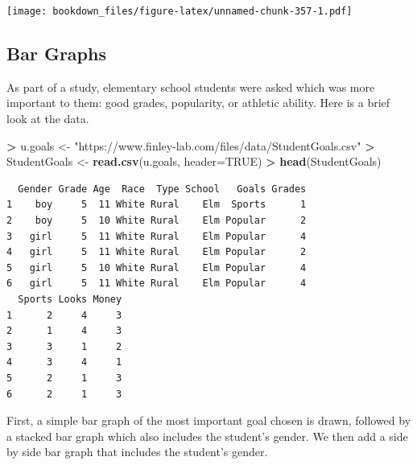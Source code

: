 \documentclass[
]{krantz}
\makeatletter
\newenvironment{Shaded}{\begin{snugshade}}{\end{snugshade}}
\newcommand{\DataTypeTok}[1]{\textcolor[rgb]{0.27,0.27,0.27}{#1}}
\newcommand{\KeywordTok}[1]{\textcolor[rgb]{0.27,0.27,0.27}{\textbf{#1}}}
\newcommand{\NormalTok}[1]{#1}
\newcommand{\OperatorTok}[1]{\textcolor[rgb]{0.43,0.43,0.43}{\textbf{#1}}}
\newcommand{\OtherTok}[1]{\textcolor[rgb]{0.37,0.37,0.37}{#1}}
\newcommand{\StringTok}[1]{\textcolor[rgb]{0.5,0.5,0.5}{#1}}
\newenvironment{kframe}{%
\medskip{}
\setlength{\fboxsep}{.8em}
 \def\at@end@of@kframe{}%
 \ifinner\ifhmode%
  \def\at@end@of@kframe{\end{minipage}}%
  \begin{minipage}{\columnwidth}%
 \fi\fi%
 \def\FrameCommand##1{\hskip\@totalleftmargin \hskip-\fboxsep
 \colorbox{shadecolor}{##1}\hskip-\fboxsep
     \hskip-\linewidth \hskip-\@totalleftmargin \hskip\columnwidth}%
 \MakeFramed {\advance\hsize-\width
   \@totalleftmargin\z@ \linewidth\hsize
   \@setminipage}}%
 {\par\unskip\endMakeFramed%
 \at@end@of@kframe}
\renewenvironment{Shaded}{\begin{kframe}}{\end{kframe}}
\makeatother
\begin{document}
\texttt{[image: bookdown\_files/figure-latex/unnamed-chunk-357-1.pdf]}

\hypertarget{bar-graphs-1}{%
\subsection{Bar Graphs}\label{bar-graphs-1}}

As part of a study, elementary school students were asked which was more important to them: good grades, popularity, or athletic ability. Here is a brief look at the data.

\begin{Shaded}
\begin{Highlighting}[]
\OperatorTok{\textgreater{}}\StringTok{ }\NormalTok{u.goals \textless{}{-}}\StringTok{ "https://www.finley{-}lab.com/files/data/StudentGoals.csv"}
\OperatorTok{\textgreater{}}\StringTok{ }\NormalTok{StudentGoals \textless{}{-}}\StringTok{ }\KeywordTok{read.csv}\NormalTok{(u.goals, }\DataTypeTok{header=}\OtherTok{TRUE}\NormalTok{)}
\OperatorTok{\textgreater{}}\StringTok{ }\KeywordTok{head}\NormalTok{(StudentGoals)}
\end{Highlighting}
\end{Shaded}

\begin{verbatim}
  Gender Grade Age  Race  Type School   Goals Grades
1    boy     5  11 White Rural    Elm  Sports      1
2    boy     5  10 White Rural    Elm Popular      2
3   girl     5  11 White Rural    Elm Popular      4
4   girl     5  11 White Rural    Elm Popular      2
5   girl     5  10 White Rural    Elm Popular      4
6   girl     5  11 White Rural    Elm Popular      4
  Sports Looks Money
1      2     4     3
2      1     4     3
3      3     1     2
4      3     4     1
5      2     1     3
6      2     1     3
\end{verbatim}

First, a simple bar graph of the most important goal chosen is drawn, followed by a stacked bar graph which also includes the student's gender. We then add a side by side bar graph that includes the student's gender.

\begin{Shaded}
\end{Shaded}
\end{document}
